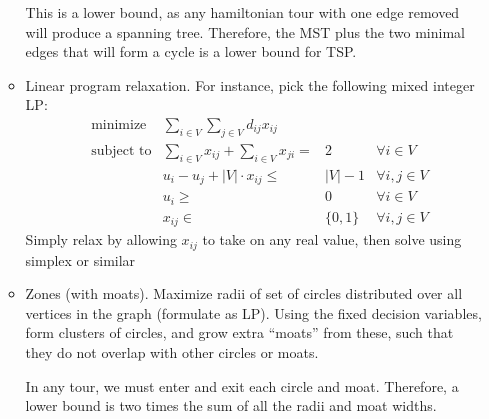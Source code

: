 \begin{itemize}
\begin{itemize}
    This is a lower bound, as any hamiltonian tour with one edge
    removed will produce a spanning tree. Therefore, the MST plus the
    two minimal edges that will form a cycle is a lower bound for TSP.
  \item Linear program relaxation. For instance, pick the following
    mixed integer LP:
    \begin{align*}
      &\text{minimize} & \sum_{i \in V} \sum_{j \in V} d_{ij} x_{ij} \\
      &\text{subject to} & \sum_{i \in V} x_{ij} + \sum_{i \in V} x_{ji} ={}& 2 & \forall i \in V \\
      &                  & u_i - u_j + |V| \cdot x_{ij} \leq{}& |V| - 1 & \forall i,j \in V \\
      &                  & u_i \geq{}& 0 & \forall i \in V \\
      &                  & x_{ij} \in{}& \{0,1\} & \forall i,j \in V
    \end{align*}
    Simply relax by allowing $x_{ij}$ to take on any real value, then
    solve using simplex or similar
  \item Zones (with moats). Maximize radii of set of circles
    distributed over all vertices in the graph (formulate as
    LP). Using the fixed decision variables, form clusters of circles,
    and grow extra ``moats'' from these, such that they do not overlap
    with other circles or moats.

    In any tour, we must enter and exit each circle and
    moat. Therefore, a lower bound is two times the sum of all the
    radii and moat widths.
  \end{itemize}
\end{itemize}

